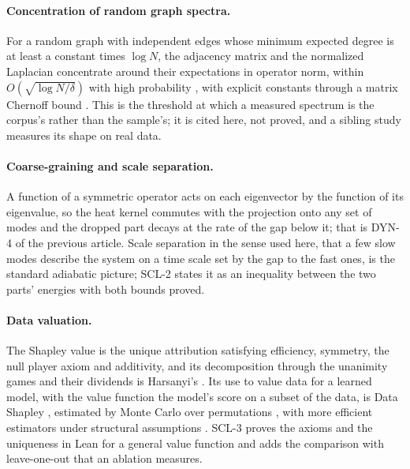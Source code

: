 \documentclass[11pt,a4paper]{article}
\theoremstyle{plain}
\theoremstyle{definition}
\theoremstyle{remark}
\begin{document}
\paragraph{Concentration of random graph spectra.}
For a random graph with independent edges whose minimum expected degree is at least a constant
times $\log N$, the adjacency matrix and the normalized Laplacian concentrate around their
expectations in operator norm, within $O(\sqrt{\log N/\delta})$ with high probability
\cite{oliveira2009concentration}, with explicit constants through a matrix Chernoff bound
\cite{chung2011spectra}. This is the threshold at which a measured spectrum is the corpus's rather
than the sample's; it is cited here, not proved, and a sibling study measures its shape on real
data.

\paragraph{Coarse-graining and scale separation.}
A function of a symmetric operator acts on each eigenvector by the function of its eigenvalue, so
the heat kernel commutes with the projection onto any set of modes and the dropped part decays at
the rate of the gap below it; that is DYN-4 of the previous article. Scale separation in the sense
used here, that a few slow modes describe the system on a time scale set by the gap to the fast
ones, is the standard adiabatic picture; SCL-2 states it as an inequality between the two parts'
energies with both bounds proved.

\paragraph{Data valuation.}
The Shapley value \cite{shapley1953value} is the unique attribution satisfying efficiency,
symmetry, the null player axiom and additivity, and its decomposition through the unanimity games
and their dividends is Harsanyi's \cite{harsanyi1963bargaining}. Its use to value data for a learned
model, with the value function the model's score on a subset of the data, is Data Shapley
\cite{ghorbani2019data}, estimated by Monte Carlo over permutations \cite{castro2009polynomial},
with more efficient estimators under structural assumptions \cite{jia2019efficient}. SCL-3 proves
the axioms and the uniqueness in Lean for a general value function and adds the comparison with
leave-one-out that an ablation measures.
\end{document}
